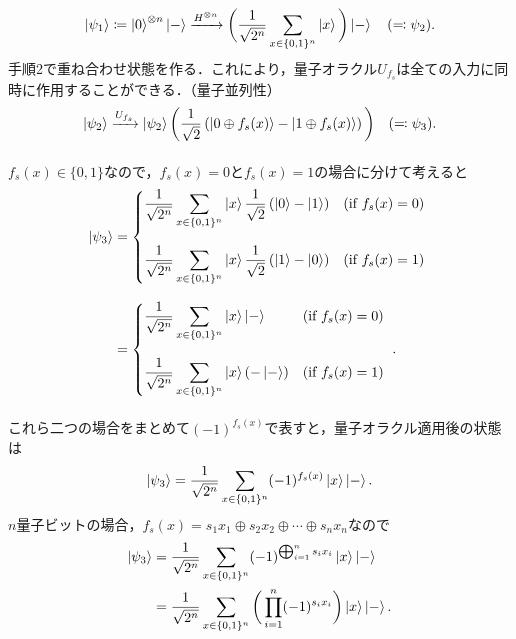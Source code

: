 \begin{align*}
    \ket{\psi_1}\coloneq\ket{0}^{\otimes n}\ket{-} \xrightarrow{H^{\otimes n}} \bigg( \frac{1}{\sqrt{2^n}}\sum_{x\in\{0,1\}^n}\ket{x}\bigg)\ket{-} \quad (\eqcolon{\psi_2}).
\end{align*}
手順2で重ね合わせ状態を作る．これにより，量子オラクル$U_{f_s}$は全ての入力に同時に作用することができる．（量子並列性）
\begin{align*}
    \ket{\psi_2} \xrightarrow{U_{f_s}}
    \ket{\psi_2} \bigg( \frac{1}{\sqrt{2}}\left(\ket{0 \oplus f_s(x)} - \ket{1 \oplus f_s(x)}\right) \bigg)\quad (\eqcolon{\psi_3}). \\[8pt]
\end{align*}
$f_s(x) \in \{0,1\}$なので，$f_s(x) = 0$と$f_s(x) = 1$の場合に分けて考えると
\begin{align*}
    \ket{\psi_3} 
    &=
    \begin{dcases*}
        \dfrac{1}{\sqrt{2^n}}\sum\limits_{x\in\{0,1\}^n}\ket{x}\dfrac{1}{\sqrt{2}}\left(\ket{0} - \ket{1}\right) & (\text{if $f_s(x) = 0$}) \\[8pt]
        \dfrac{1}{\sqrt{2^n}}\sum\limits_{x\in\{0,1\}^n}\ket{x}\dfrac{1}{\sqrt{2}}\left(\ket{1} - \ket{0}\right) & (\text{if $f_s(x) = 1$})
    \end{dcases*}\\[8pt]
    &= \begin{dcases*}
        \dfrac{1}{\sqrt{2^n}}\sum\limits_{x\in\{0,1\}^n}\ket{x}\ket{-} & (\text{if $f_s(x) = 0$}) \\[8pt]
        \dfrac{1}{\sqrt{2^n}}\sum\limits_{x\in\{0,1\}^n}\ket{x}(-\ket{-}) & (\text{if $f_s(x) = 1$})
    \end{dcases*}.\\[8pt]
\end{align*}
これら二つの場合をまとめて$(-1)^{f_s(x)}$で表すと，量子オラクル適用後の状態は
\begin{align*}
    \ket{\psi_3} =\dfrac{1}{\sqrt{2^n}}\sum_{x\in\{0,1\}^n} (-1)^{f_s(x)}\ket{x}\ket{-}.
\end{align*}
$n$量子ビットの場合，$f_s(x) = s_1x_1 \oplus s_2x_2 \oplus \cdots \oplus s_nx_n$なので
\begin{align*}
    \ket{\psi_3}
    &= \frac{1}{\sqrt{2^n}}\sum_{x\in\{0,1\}^n} (-1)^{\bigoplus_{i=1}^n s_i x_i}\ket{x}\ket{-} \\
    &= \frac{1}{\sqrt{2^n}}\sum_{x\in\{0,1\}^n} \bigg(\prod_{i=1}^n (-1)^{s_i x_i}\bigg) \ket{x}\ket{-}. \\
\end{align*}

